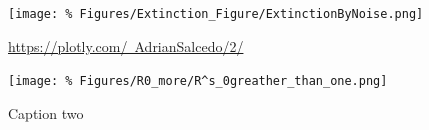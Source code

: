 \begin{figure}[h]
	\centering	
	\texttt{[image: \%
	Figures/Extinction\_Figure/ExtinctionByNoise.png]}
	\caption{%
		\href{https://plotly.com/~AdrianSalcedo/2/}{%
		https://plotly.com/~AdrianSalcedo/2/}}
	\label{fig:ExtinctionByNoise}
\end{figure}
\begin{figure}[h]
	\centering
	\texttt{[image: \%
	Figures/R0\_more/R^s\_0greather\_than\_one.png]}
	\caption{Caption two}
	\label{fig:Rs0GreatherThanOne}
\end{figure}
